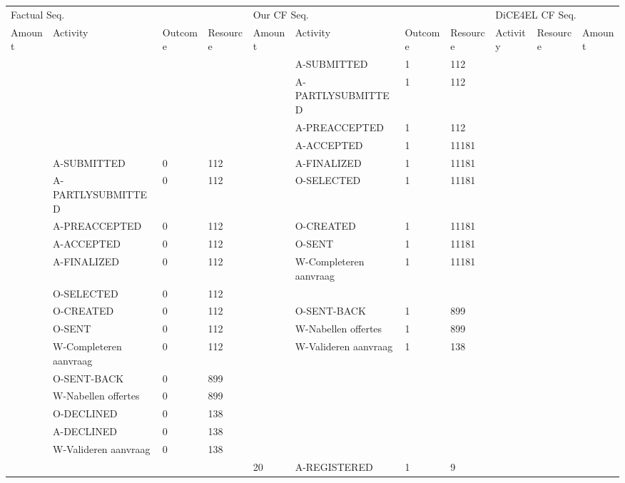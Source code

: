 \begin{tabular}{lllllllllll}
\toprule
\multicolumn{4}{l}{Factual Seq.} & \multicolumn{4}{l}{Our CF Seq.} & \multicolumn{3}{l}{DiCE4EL CF Seq.} \\
Amount & Activity & Outcome & Resource & Amount & Activity & Outcome & Resource & Activity & Resource & Amount \\
\midrule
 &  &  &  &  & A-SUBMITTED & 1 & 112 &  &  &  \\
 &  &  &  &  & A-PARTLYSUBMITTED & 1 & 112 &  &  &  \\
 &  &  &  &  & A-PREACCEPTED & 1 & 112 &  &  &  \\
 &  &  &  &  & A-ACCEPTED & 1 & 11181 &  &  &  \\
 & A-SUBMITTED & 0 & 112 &  & A-FINALIZED & 1 & 11181 &  &  &  \\
 & A-PARTLYSUBMITTED & 0 & 112 &  & O-SELECTED & 1 & 11181 &  &  &  \\
 & A-PREACCEPTED & 0 & 112 &  & O-CREATED & 1 & 11181 &  &  &  \\
 & A-ACCEPTED & 0 & 112 &  & O-SENT & 1 & 11181 &  &  &  \\
 & A-FINALIZED & 0 & 112 &  & W-Completeren aanvraag & 1 & 11181 &  &  &  \\
 & O-SELECTED & 0 & 112 &  &  &  &  &  &  &  \\
 & O-CREATED & 0 & 112 &  & O-SENT-BACK & 1 & 899 &  &  &  \\
 & O-SENT & 0 & 112 &  & W-Nabellen offertes & 1 & 899 &  &  &  \\
 & W-Completeren aanvraag & 0 & 112 &  & W-Valideren aanvraag & 1 & 138 &  &  &  \\
 & O-SENT-BACK & 0 & 899 &  &  &  &  &  &  &  \\
 & W-Nabellen offertes & 0 & 899 &  &  &  &  &  &  &  \\
 & O-DECLINED & 0 & 138 &  &  &  &  &  &  &  \\
 & A-DECLINED & 0 & 138 &  &  &  &  &  &  &  \\
 & W-Valideren aanvraag & 0 & 138 &  &  &  &  &  &  &  \\
 &  &  &  & 20 & A-REGISTERED & 1 & 9 &  &  &  \\
\bottomrule
\end{tabular}
